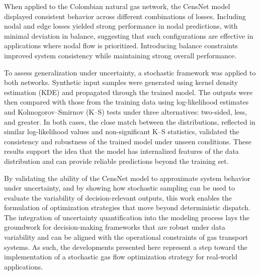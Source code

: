 When applied to the Colombian natural gas network, the CensNet model displayed consistent behavior across different combinations of losses. Including nodal and edge losses yielded strong performance in nodal predictions, with minimal deviation in balance, suggesting that such configurations are effective in applications where nodal flow is prioritized. Introducing balance constraints improved system consistency while maintaining strong overall performance.

To assess generalization under uncertainty, a stochastic framework was applied to both networks. Synthetic input samples were generated using kernel density estimation (KDE) and propagated through the trained model. The outputs were then compared with those from the training data using log-likelihood estimates and Kolmogorov–Smirnov (K–S) tests under three alternatives: two-sided, less, and greater. In both cases, the close match between the distributions, reflected in similar log-likelihood values and non-significant K–S statistics, validated the consistency and robustness of the trained model under unseen conditions. These results support the idea that the model has internalized features of the data distribution and can provide reliable predictions beyond the training set.


By validating the ability of the CensNet model to approximate system behavior under uncertainty, and by showing how stochastic sampling can be used to evaluate the variability of decision-relevant outputs, this work enables the formulation of optimization strategies that move beyond deterministic dispatch. The integration of uncertainty quantification into the modeling process lays the groundwork for decision-making frameworks that are robust under data variability and can be aligned with the operational constraints of gas transport systems. As such, the developments presented here represent a step toward the implementation of a stochastic gas flow optimization strategy for real-world applications.


